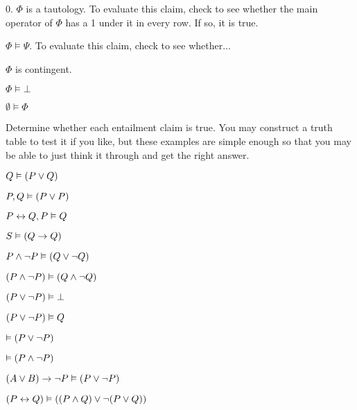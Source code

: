 \begin{earg}
		\item[0.] $\Phi$ is a tautology.
		To evaluate this claim, check to see whether the main operator of $\Phi$ has a 1 under it in every row. If so, it is true.
		\item $\Phi \vDash \Psi$. 
		To evaluate this claim, check to see whether... 
		
		\item $\Phi$ is contingent.
\item $\Phi \vDash \bot$
		\item $\emptyset \vDash \Phi$
	\end{earg}


\problempart
Determine whether each entailment claim is true. You may construct a truth table to test it if you like, but these examples are simple enough so that you may be able to just think it through and get the right answer.
\begin{earg}
\item $Q \vDash (P \vee Q)$
\item $P, Q \vDash (P \vee P)$
\item $P \leftrightarrow Q, P \vDash Q$ %
\item $S \vDash (Q \rightarrow Q)$   %
\item $P \wedge \neg P \vDash (Q \vee \neg Q)$%
\item $(P \wedge \neg P) \vDash (Q \wedge \neg Q)$
\item $(P \vee \neg P) \vDash \bot$
\item $(P \vee \neg P) \vDash Q$%
\item $\vDash (P \vee \neg P)$
\item $\vDash (P \wedge \neg P)$
\item $(A \vee B) \rightarrow \neg P \vDash (P \vee \neg P)$
\item $(P \leftrightarrow Q) \vDash ((P \wedge Q) \vee \neg (P \vee Q))$
\end{earg}

\fi 


